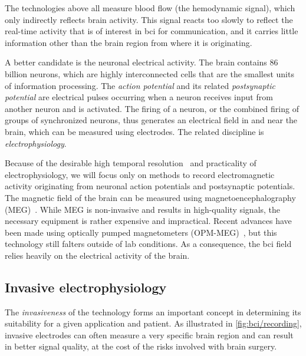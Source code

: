 The technologies above all measure blood flow (the hemodynamic signal), which only
indirectly reflects brain activity.
This signal reacts too slowly to reflect the real-time activity that is of interest in
\ac{bci} for communication, and it carries little information other than the brain
region from where it is originating.

A better candidate is the neuronal electrical activity.
The brain contains 86 billion neurons, which are highly interconnected cells that are
the smallest units of information processing.
The \emph{action potential} and its related \emph{postsynaptic potential} are electrical
pulses occurring when a neuron receives input from another neuron and is activated.
The firing of a neuron, or the combined firing of groups of synchronized neurons, thus
generates an electrical field in and near the brain, which can be measured using
electrodes.
The related discipline is \emph{electrophysiology}.

Because of the desirable high temporal resolution~\cite{Easttom2021} and practicality of
electrophysiology, we will focus only on methods to record electromagnetic activity
originating from neuronal action potentials and postsynaptic potentials.
The magnetic field of the brain can be measured using magnetoencephalography
(MEG)~\cite{Mellinger2007}.
While MEG is non-invasive and results in high-quality signals, the necessary equipment
is rather expensive and impractical.
Recent advances have been made using optically pumped magnetometers
(OPM-MEG)~\cite{Wittevrongel2021}, but this technology still falters outside of lab
conditions.
As a consequence, the \ac{bci} field relies heavily on the electrical activity of the
brain.

\subsection{Invasive electrophysiology}

The \emph{invasiveness} of the technology forms an important concept in determining its
suitability for a given application and patient.
As illustrated in \autoref{fig:bci/recording}, invasive electrodes can often measure a
very specific brain region and can result in better signal quality, at the cost of the
risks involved with brain surgery.

